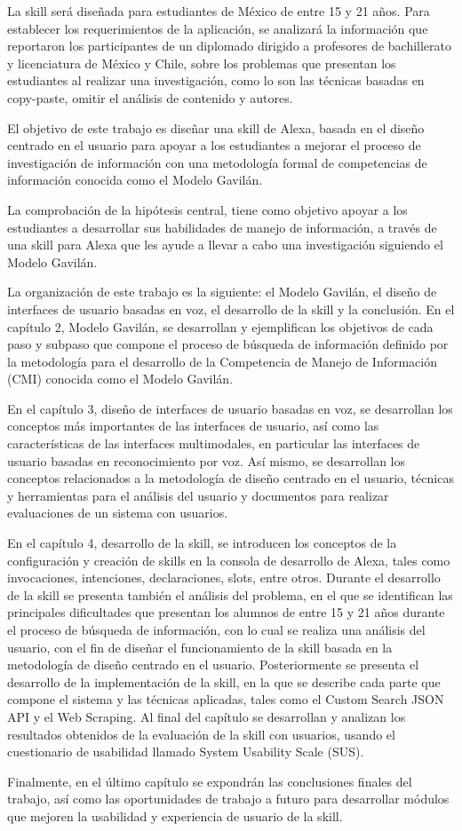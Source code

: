 La skill será diseñada para estudiantes de México de entre 15 y 21 años. Para establecer los requerimientos de la aplicación, se analizará la información que reportaron los participantes de un diplomado dirigido a profesores de bachillerato y licenciatura de México y Chile, sobre los problemas que presentan los estudiantes al realizar una investigación, como lo son las técnicas basadas en copy-paste, omitir el análisis de contenido y autores.

El objetivo de este trabajo es diseñar una skill de Alexa, basada en el diseño centrado en el usuario para apoyar a los estudiantes a mejorar el proceso de investigación de información con una metodología formal de competencias de información conocida como el Modelo Gavilán.

La comprobación de la hipótesis central, tiene como objetivo apoyar a los estudiantes a desarrollar sus habilidades de manejo de información, a través de una skill para Alexa que les ayude a llevar a cabo una investigación siguiendo el Modelo Gavilán.

La organización de este trabajo es la siguiente: el Modelo Gavilán, el diseño de interfaces de usuario basadas en voz, el desarrollo de la skill y la conclusión. En el capítulo 2, Modelo Gavilán, se desarrollan y ejemplifican los objetivos de cada paso y subpaso que compone el proceso de búsqueda de información definido por la metodología para el desarrollo de la Competencia de Manejo de Información (CMI) conocida como el Modelo Gavilán.

En el capítulo 3, diseño de interfaces de usuario basadas en voz, se desarrollan los conceptos más importantes de las interfaces de usuario, así como las características de las interfaces multimodales, en particular las interfaces de usuario basadas en reconocimiento por voz. Así mismo, se desarrollan los conceptos relacionados a la metodología de diseño centrado en el usuario, técnicas y herramientas para el análisis del usuario y documentos para realizar evaluaciones de un sistema con usuarios.

En el capítulo 4, desarrollo de la skill, se introducen los conceptos de la configuración y creación de skills en la consola de desarrollo de Alexa, tales como invocaciones, intenciones, declaraciones, slots, entre otros. Durante el desarrollo de la skill se presenta también el análisis del problema, en el que se identifican las principales dificultades que presentan los alumnos de entre 15 y 21 años durante el proceso de búsqueda de información, con lo cual se realiza una análisis del usuario, con el fin de diseñar el funcionamiento de la skill basada en la metodología de diseño centrado en el usuario. Posteriormente se presenta el desarrollo de la implementación de la skill, en la que se describe cada parte que compone el sistema y las técnicas aplicadas, tales como el Custom Search JSON API y el Web Scraping. Al final del capítulo se desarrollan y analizan los resultados obtenidos de la evaluación de la skill con usuarios, usando el cuestionario de usabilidad llamado System Usability Scale (SUS).

Finalmente, en el último capítulo se expondrán las conclusiones finales del trabajo, así como las oportunidades de trabajo a futuro para desarrollar módulos que mejoren la usabilidad y experiencia de usuario de la skill.

